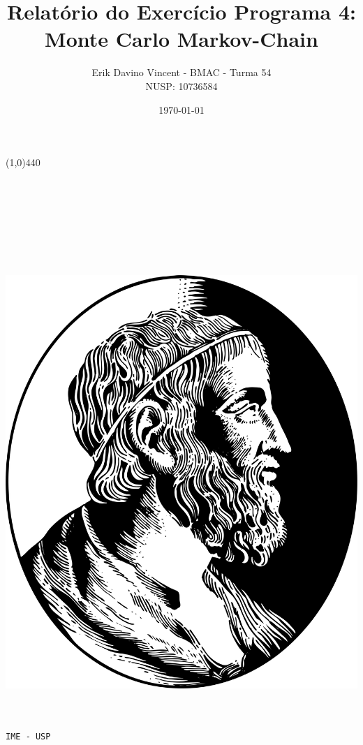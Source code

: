 \documentclass[pt12]{article}
\begin{document}
\begin{titlepage}

\title{\textbf{Relatório do Exercício Programa 4:\\Monte Carlo Markov-Chain}}
\author{Erik Davino Vincent - BMAC - Turma 54 \\ NUSP: 10736584}
\date{\today}
\maketitle
\line(1,0){440}
\ \\
\ \\
\ \\
\ \\
\ \\
\ \\
\ \\
\ \\
\begin{center}

\includegraphics[scale=0.1]{ime.png}\\
\ \\
\ \\
\begin{LARGE}\tt{IME - USP} \end{LARGE}


\end{center}

\end{titlepage}
\end{document}
